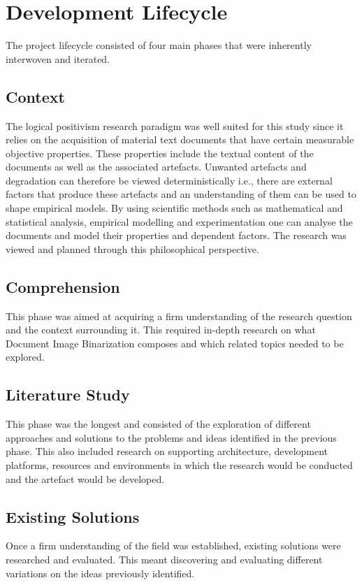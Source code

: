 \documentclass[a4paper, 12pt]{report}
\begin{document}
\newpage

\section{Development Lifecycle}
The project lifecycle consisted of four main phases that were inherently interwoven and iterated.

\subsection{Context}
The logical positivism research paradigm was well suited for this study since it relies on the acquisition of material text documents that have certain measurable objective properties. These properties include the textual content of the documents as well as the associated artefacts. Unwanted artefacts and degradation can therefore be viewed deterministically i.e., there are external factors that produce these artefacts and an understanding of them can be used to shape empirical models. By using scientific methods such as mathematical and statistical analysis, empirical modelling and experimentation one can analyse the documents and model their properties and dependent factors.
The research was viewed and planned through this philosophical perspective.\par

\subsection{Comprehension}
This phase was aimed at acquiring a firm understanding of the research question and the context surrounding it. This required in-depth research on what Document Image Binarization composes and which related topics needed to be explored.

\subsection{Literature Study}
This phase was the longest and consisted of the exploration of different approaches and solutions to the problems and ideas identified in the previous phase. This also included research on supporting architecture, development platforms, resources and environments in which the research would be conducted and the artefact would be developed.

\subsection{Existing Solutions}
Once a firm understanding of the field was established, existing solutions were researched and evaluated. This meant discovering and evaluating different variations on the ideas previously identified.
\end{document}
